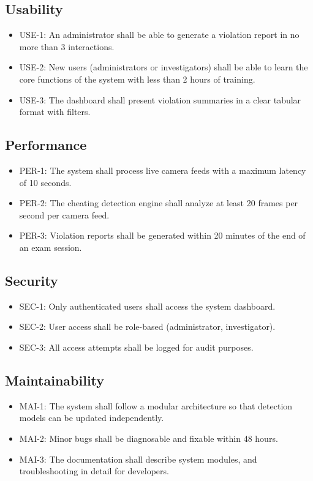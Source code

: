 \subsection{Usability}
\begin{itemize}
    \item USE-1: An administrator shall be able to generate a violation report in no more than 3 interactions.  
    \item USE-2: New users (administrators or investigators) shall be able to learn the core functions of the system with less than 2 hours of training.  
    \item USE-3: The dashboard shall present violation summaries in a clear tabular format with filters.
\end{itemize}

\subsection{Performance}
\begin{itemize}
    \item PER-1: The system shall process live camera feeds with a maximum latency of 10 seconds.  
    \item PER-2: The cheating detection engine shall analyze at least 20 frames per second per camera feed.  
    \item PER-3: Violation reports shall be generated within 20 minutes of the end of an exam session.  
\end{itemize}

\subsection{Security}
\begin{itemize}
    \item SEC-1: Only authenticated users shall access the system dashboard.  
    \item SEC-2: User access shall be role-based (administrator, investigator).  
    \item SEC-3: All access attempts shall be logged for audit purposes.  
\end{itemize}

\subsection{Maintainability}
\begin{itemize}
    \item MAI-1: The system shall follow a modular architecture so that detection models can be updated independently.  
    \item MAI-2: Minor bugs shall be diagnosable and fixable within 48 hours.  
    \item MAI-3: The documentation shall describe system modules, and troubleshooting in detail for developers.  
\end{itemize}
\clearpage



